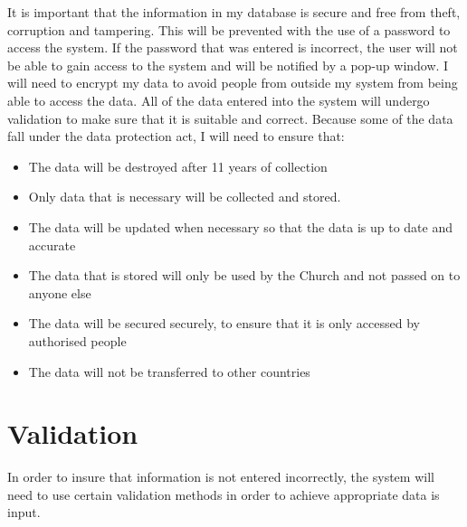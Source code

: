 It is important that the information in my database is secure and free from theft, corruption and tampering. This will be prevented with the use of a password to access the system. If the password that was entered is incorrect, the user will not be able to gain access to the system and will be notified by a pop-up window. I will need to encrypt my data to avoid people from outside my system from being able to access the data. All of the data entered into the system will undergo validation to make sure that it is suitable and correct.
Because some of the data fall under the data protection act, I will need to ensure that:
\begin{itemize}
    \item The data will be destroyed after 11 years of collection
    \item Only data that is necessary will be collected and stored.
    \item The data will be updated when necessary so that the data is up to date and accurate
    \item The data that is stored will only be used by the Church and not passed on to anyone else
    \item The data will be secured securely, to ensure that it is only accessed by authorised people
    \item The data will not be transferred to other countries
\end{itemize}


\section{Validation}

In order to insure that information is not entered incorrectly, the system will need to use certain validation methods in order to achieve appropriate data is input.

